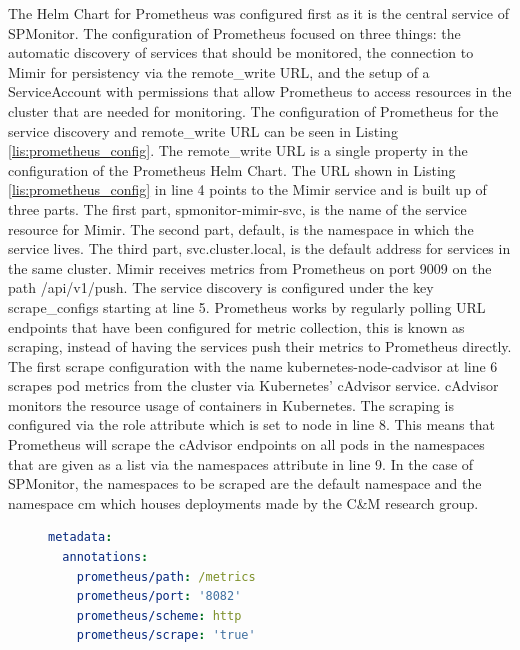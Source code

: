 The Helm Chart for Prometheus \cite{PRO-HELM} was configured first as it is the central service
of SPMonitor. The configuration of Prometheus focused on three things: the automatic discovery of services
that should be monitored, the connection to Mimir for persistency via the remote\_write URL, and the setup of a ServiceAccount
with permissions that allow Prometheus to access resources in the cluster that are needed for monitoring.
The configuration of Prometheus for the service discovery and remote\_write URL can
be seen in Listing \ref{lis:prometheus_config}.
The remote\_write URL is a single property in the configuration of the Prometheus
Helm Chart. The URL shown in Listing \ref{lis:prometheus_config} in line 4 points to the Mimir service
and is built up of three parts. The first part, spmonitor-mimir-svc, is the name
of the service resource for Mimir. The second part, default, is the namespace in which
the service lives. The third part, svc.cluster.local, is the default address
for services in the same cluster. Mimir receives metrics from Prometheus on port 9009
on the path /api/v1/push.
The service discovery is configured under the key scrape\_configs starting at line 5.
Prometheus works by regularly polling URL endpoints that have been configured
for metric collection, this is known as scraping, instead of having the services
push their metrics to Prometheus directly. The first scrape configuration with the name
kubernetes-node-cadvisor at line 6 scrapes pod metrics from the cluster via Kubernetes' cAdvisor service.
cAdvisor monitors the resource usage of containers in Kubernetes. The scraping is configured
via the role attribute which is set to node in line 8. This means that Prometheus will scrape the cAdvisor
endpoints on all pods in the namespaces that are given as a list via the namespaces attribute in line 9.
In the case of SPMonitor, the namespaces to be scraped are the default namespace and the namespace cm
which houses deployments made by the C\&M research group.

\begin{figure}[tb]
\begin{lstlisting}[caption = {Scrapable Endpoint Configuration for Prometheus}, label = {lis:scrape_endpoint_configuration}, style = kit-cm, language=yaml]
metadata:
  annotations:
    prometheus/path: /metrics
    prometheus/port: '8082'
    prometheus/scheme: http
    prometheus/scrape: 'true'
\end{lstlisting}
\end{figure}

